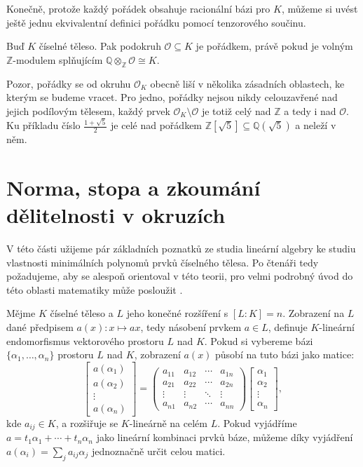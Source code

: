 \documentclass[12pt]{report}
\begin{document}
Konečně, protože každý pořádek obsahuje racionální bázi pro $K$, můžeme si uvést ještě  jednu ekvivalentní definici pořádku pomocí tenzorového součinu.
\begin{dusledek}\label{poradektensor}
Buď $K$ číselné těleso. Pak podokruh $\mathcal{O} \subseteq K$ je pořádkem, právě pokud je volným $\mathbb{Z}$-modulem splňujícím $\mathbb{Q} \otimes_{\mathbb{Z}} \mathcal{O} \cong K$.
\end{dusledek}

Pozor, pořádky se od okruhu $\mathcal{O}_K$ obecně liší v několika zásadních oblastech, ke kterým se budeme vracet. Pro jedno, pořádky nejsou nikdy celouzavřené nad jejich podílovým tělesem, každý prvek $\mathcal{O}_K \setminus \mathcal{O}$ je totiž celý nad $\mathbb{Z}$ a tedy i nad $\mathcal{O}$. Ku příkladu číslo $\frac{1+\sqrt{5}}{2}$ je celé nad pořádkem $\mathbb{Z}[\sqrt{5}] \subseteq \mathbb{Q}(\sqrt{5})$ a neleží v něm.

\section{Norma, stopa a zkoumání dělitelnosti v okruzích}

V této části užijeme pár základních poznatků ze studia lineární algebry ke studiu vlastnosti minimálních polynomů prvků číselného tělesa. Po čtenáři tedy požadujeme, aby se alespoň  orientoval v této teorii, pro velmi podrobný úvod do této oblasti matematiky může posloužit \cite{Johnson}.

Mějme $K$ číselné těleso a $L$ jeho konečné rozšíření s $[L:K] = n$. Zobrazení na $L$ dané předpisem $a(x) : x \mapsto ax$, tedy násobení prvkem $a \in L$, definuje $K$-lineární endomorfismus vektorového prostoru $L$ nad $K$. Pokud si vybereme bázi $\lbrace \alpha_1,\dots,\alpha_n \rbrace$ prostoru $L$ nad $K$, zobrazení $a(x)$ působí na tuto bázi jako matice:
\begin{equation*}
\begin{bmatrix}
a(\alpha_1) \\
a(\alpha_2) \\
\vdots\\
a(\alpha_n)
\end{bmatrix} = \begin{pmatrix}
a_{11} & a_{12} & \cdots & a_{1n}\\
a_{21} & a_{22} & \cdots & a_{2n}\\
\vdots & \vdots & \ddots &\vdots\\
a_{n1} & a_{n2} & \cdots& a_{nn}
\end{pmatrix} \begin{bmatrix}
\alpha_1 \\
\alpha_2 \\
\vdots\\
\alpha_n
\end{bmatrix},
\end{equation*}
kde $a_{ij} \in K$, a rozšiřuje se $K$-lineárně na celém $L$. Pokud vyjádříme $a = t_1 \alpha_1 + \cdots + t_n \alpha_n$ jako lineární kombinaci prvků báze, můžeme díky vyjádření $a(\alpha_i) = \sum_j a_{ij} \alpha_{j}$ jednoznačně určit celou matici.
\end{document}
